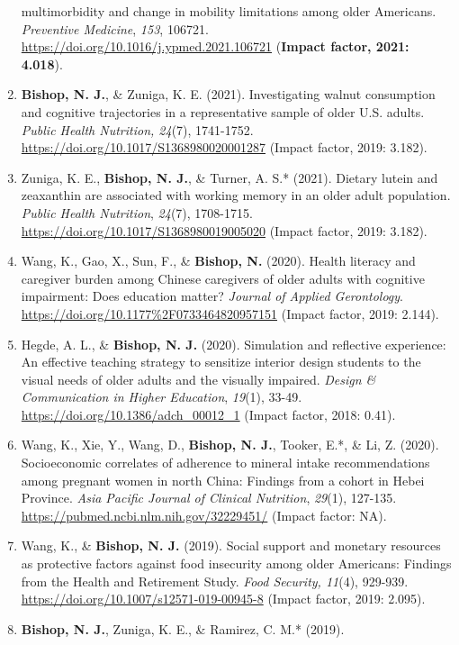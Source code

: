 \documentclass[
]{article}
\begin{document}
\begin{enumerate}
  multimorbidity and change in mobility limitations among older
  Americans. \emph{Preventive Medicine}, \emph{153}, 106721.
  \url{https://doi.org/10.1016/j.ypmed.2021.106721} (\textbf{Impact
  factor, 2021: 4.018}).
\item
  \textbf{Bishop, N. J.}, \& Zuniga, K. E. (2021). Investigating walnut
  consumption and cognitive trajectories in a representative sample of
  older U.S. adults. \emph{Public Health Nutrition, 24}(7), 1741-1752.
  \url{https://doi.org/10.1017/S1368980020001287} (Impact factor, 2019:
  3.182).
\item
  Zuniga, K. E., \textbf{Bishop, N. J.}, \& Turner, A. S.* (2021).
  Dietary lutein and zeaxanthin are associated with working memory in an
  older adult population. \emph{Public Health Nutrition}, \emph{24}(7),
  1708-1715. \url{https://doi.org/10.1017/S1368980019005020} (Impact
  factor, 2019: 3.182).
\item
  Wang, K., Gao, X., Sun, F., \& \textbf{Bishop, N.} (2020). Health
  literacy and caregiver burden among Chinese caregivers of older adults
  with cognitive impairment: Does education matter? \emph{Journal of
  Applied Gerontology}.
  \url{https://doi.org/10.1177\%2F0733464820957151} (Impact factor,
  2019: 2.144).
\item
  Hegde, A. L., \& \textbf{Bishop, N. J.} (2020). Simulation and
  reflective experience: An effective teaching strategy to sensitize
  interior design students to the visual needs of older adults and the
  visually impaired. \emph{Design \& Communication in Higher Education},
  \emph{19}(1), 33-49. \url{https://doi.org/10.1386/adch_00012_1}
  (Impact factor, 2018: 0.41).
\item
  Wang, K., Xie, Y., Wang, D., \textbf{Bishop, N. J.}, Tooker, E.*, \&
  Li, Z. (2020). Socioeconomic correlates of adherence to mineral intake
  recommendations among pregnant women in north China: Findings from a
  cohort in Hebei Province. \emph{Asia Pacific Journal of Clinical
  Nutrition}, \emph{29}(1), 127-135.
  \url{https://pubmed.ncbi.nlm.nih.gov/32229451/} (Impact factor: NA).
\item
  Wang, K., \& \textbf{Bishop, N. J.} (2019). Social support and
  monetary resources as protective factors against food insecurity among
  older Americans: Findings from the Health and Retirement Study.
  \emph{Food Security, 11}(4), 929-939.
  \url{https://doi.org/10.1007/s12571-019-00945-8} (Impact factor, 2019:
  2.095).
\item
  \textbf{Bishop, N. J.}, Zuniga, K. E., \& Ramirez, C. M.* (2019).

\end{enumerate}
\end{document}
